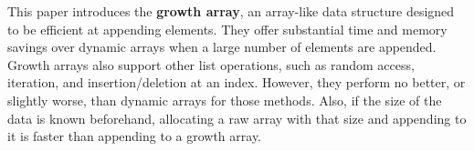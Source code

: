 This paper introduces the \textbf{growth array}, an array-like data structure designed to be efficient at appending elements. They offer substantial time and memory savings over dynamic arrays when a large number of elements are appended. Growth arrays also support other list operations, such as random access, iteration, and insertion/deletion at an index. However, they perform no better, or slightly worse, than dynamic arrays for those methods. Also, if the size of the data is known beforehand, allocating a raw array with that size and appending to it is faster than appending to a growth array.